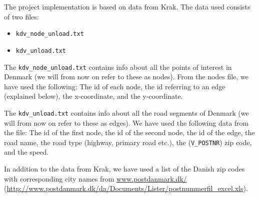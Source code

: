 The project implementation is based on data from Krak. The data used consists of two files:
\begin{itemize}
	\item \texttt{kdv\_node\_unload.txt}
	\item \texttt{kdv\_unload.txt}
\end{itemize}
The \texttt{kdv\_node\_unload.txt} contains info about all the points of interest in Denmark (we will from now on refer to these as nodes). From the nodes file, we have used the following: The id of each node, the id referring to an edge (explained below), the x-coordinate, and the y-coordinate.

The \texttt{kdv\_unload.txt} contains info about all the road segments of Denmark (we will from now on refer to these as edges). We have used the following data from the file: The id of the first node, the id of the second node, the id of the edge, the road name, the road type (highway, primary road etc.), the (\texttt{V\_POSTNR}) zip code, and the speed.

In addition to the data from Krak, we have used a list of the Danish zip codes with corresponding city names from \href{http://www.postdanmark.dk/da/Documents/Lister/postnummerfil_excel.xls}{www.postdanmark.dk/} (\url{http://www.postdanmark.dk/da/Documents/Lister/postnummerfil_excel.xls}).